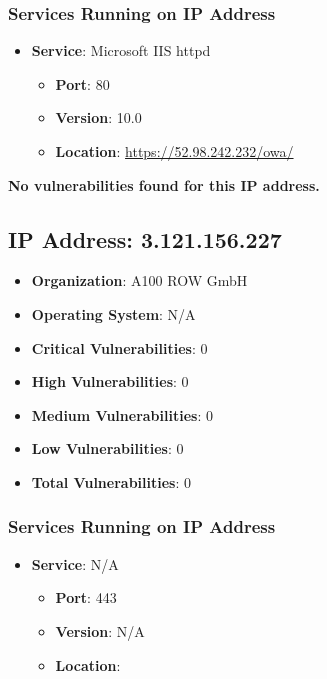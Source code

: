 \documentclass{article}
\begin{document}
\subsubsection*{Services Running on IP Address}

\begin{itemize}
    
        \item \textbf{Service}: Microsoft IIS httpd
        \begin{itemize}
            \item \textbf{Port}: 80
            \item \textbf{Version}:  10.0 
            \item \textbf{Location}: \href{ https://52.98.242.232/owa/ }{ https://52.98.242.232/owa/ }
        \end{itemize}
    
\end{itemize}


\textbf{No vulnerabilities found for this IP address.}




\clearpage



\subsection*{IP Address: 3.121.156.227}

\begin{itemize}
    \item \textbf{Organization}: A100 ROW GmbH
    \item \textbf{Operating System}:  N/A 
    \item \textbf{Critical Vulnerabilities}: 0
    \item \textbf{High Vulnerabilities}: 0
    \item \textbf{Medium Vulnerabilities}: 0
    \item \textbf{Low Vulnerabilities}: 0
    \item \textbf{Total Vulnerabilities}: 0
\end{itemize}

\subsubsection*{Services Running on IP Address}

\begin{itemize}
    
        \item \textbf{Service}: N/A
        \begin{itemize}
            \item \textbf{Port}: 443
            \item \textbf{Version}:  N/A 
            \item \textbf{Location}: \href{  }{  }
        \end{itemize}
    
\end{itemize}
\end{document}
